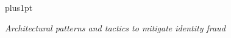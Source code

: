 \documentclass[twoside,11pt]{Latex/Classes/PhDthesisPSnPDF}
\begin{document}
\newpage


       
\hfuzz=50pt






\renewcommand\baselinestretch{1.2}
\baselineskip=18pt plus1pt



\begin{center}
\textit{Architectural patterns and tactics to mitigate identity fraud}
\end{center}


\newpage
%
%
%
%








%   
\end{document}
